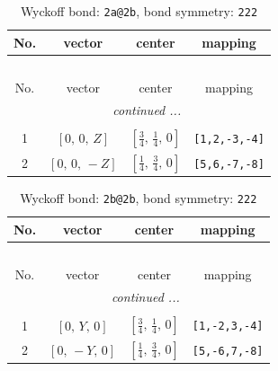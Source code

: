 \documentclass[fleqn,8pt]{jsarticle}
\begin{document}
\begin{longtable}{cccc}
\caption{Wyckoff bond: {\tt 2a@2b}, bond symmetry: {\tt 222}}
 \\
 \hline \hline
No. & vector & center & mapping \\ \hline \endfirsthead

\multicolumn{3}{l}{\tablename\ \thetable{}} \\
 \hline \hline
No. & vector & center & mapping \\ \hline \endhead

 \hline \hline
\multicolumn{3}{r}{\footnotesize\it continued ...} \\ \endfoot

 \hline \hline
\multicolumn{3}{r}{} \\ \endlastfoot

1 & $\left[ 0,\, 0,\, Z \right]$ & $\left[ \frac{3}{4},\, \frac{1}{4},\, 0 \right]$ & {\tt [1,2,-3,-4]} \\ \hline
2 & $\left[ 0,\, 0,\, - Z \right]$ & $\left[ \frac{1}{4},\, \frac{3}{4},\, 0 \right]$ & {\tt [5,6,-7,-8]} \\
\end{longtable}
\renewcommand{\arraystretch}{1.2}
\begin{longtable}{cccc}
\caption{Wyckoff bond: {\tt 2b@2b}, bond symmetry: {\tt 222}}
 \\
 \hline \hline
No. & vector & center & mapping \\ \hline \endfirsthead

\multicolumn{3}{l}{\tablename\ \thetable{}} \\
 \hline \hline
No. & vector & center & mapping \\ \hline \endhead

 \hline \hline
\multicolumn{3}{r}{\footnotesize\it continued ...} \\ \endfoot

 \hline \hline
\multicolumn{3}{r}{} \\ \endlastfoot

1 & $\left[ 0,\, Y,\, 0 \right]$ & $\left[ \frac{3}{4},\, \frac{1}{4},\, 0 \right]$ & {\tt [1,-2,3,-4]} \\ \hline
2 & $\left[ 0,\, - Y,\, 0 \right]$ & $\left[ \frac{1}{4},\, \frac{3}{4},\, 0 \right]$ & {\tt [5,-6,7,-8]} \\
\end{longtable}
\renewcommand{\arraystretch}{1.2}
\end{document}
